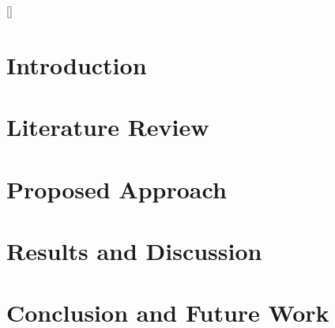 \documentclass[a4paper, 12pt]{report}
\begin{document}
{
[\vfill\null\thispagestyle{empty}\clearpage]
\titlespacing{\chapter}{0pt}{0ex}{0ex}


\pagestyle{body}

\chapter{Introduction}
\label{chapter:introduction}

\newpage

\chapter{Literature Review}
\label{chapter:literature}

\newpage

\chapter{Proposed Approach}
\label{chapter:methodology}

\newpage

\chapter{Results and Discussion}
\label{chapter:experiment}

\newpage

\chapter{Conclusion and Future Work}
\label{chapter:conclusion}

\newpage
}


\pagestyle{plain}







% 
\end{document}
